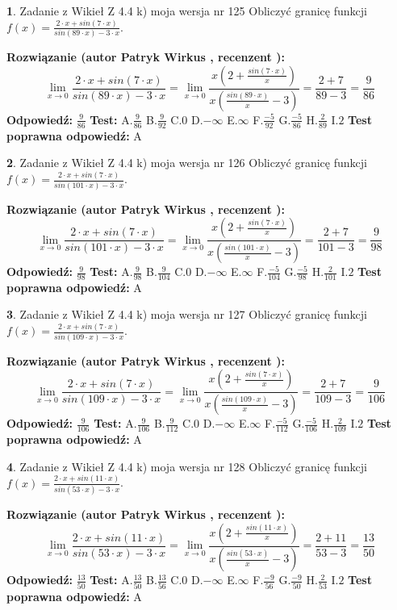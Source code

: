 \documentclass[12pt, a4paper]{article}
\theoremstyle{definition} %
\newtheorem{zad}{}
\newcommand{\zadStart}[1]{\begin{zad}#1\newline}
\newcommand{\zadStop}{\end{zad}}
\newcommand{\rozwStart}[2]{\noindent \textbf{Rozwiązanie (autor #1 , recenzent #2): }\newline}
\newcommand{\rozwStop}{\newline}
\newcommand{\odpStart}{\noindent \textbf{Odpowiedź:}\newline}
\newcommand{\odpStop}{\newline}
\newcommand{\testStart}{\noindent \textbf{Test:}\newline}
\newcommand{\testStop}{\newline}
\newcommand{\kluczStart}{\noindent \textbf{Test poprawna odpowiedź:}\newline}
\newcommand{\kluczStop}{\newline}
\begin{document}
\zadStart{Zadanie z Wikieł Z 4.4 k) moja wersja nr 125}
Obliczyć granicę funkcji $f(x)=\frac{2\cdot x +sin(7\cdot x)}{sin(89\cdot x) -3\cdot x}$.
\zadStop
\rozwStart{Patryk Wirkus}{}
$$\lim\limits_{x\to 0}\frac{2\cdot x +sin(7\cdot x)}{sin(89\cdot x) -3\cdot x}
=\lim\limits_{x\to 0}\frac{x(2+\frac{sin(7\cdot x)}{x})}{x(\frac{sin(89\cdot x)}{x}-3)}
=\frac{2+7}{89-3} = \frac{9}{86}$$
\rozwStop
\odpStart
$\frac{9}{86}$
\odpStop
\testStart
A.$\frac{9}{86}$
B.$\frac{9}{92}$
C.$0$
D.$-\infty$
E.$\infty$
F.$\frac{-5}{92}$
G.$\frac{-5}{86}$
H.$\frac{2}{89}$
I.$2$
\testStop
\kluczStart
A
\kluczStop



\zadStart{Zadanie z Wikieł Z 4.4 k) moja wersja nr 126}
Obliczyć granicę funkcji $f(x)=\frac{2\cdot x +sin(7\cdot x)}{sin(101\cdot x) -3\cdot x}$.
\zadStop
\rozwStart{Patryk Wirkus}{}
$$\lim\limits_{x\to 0}\frac{2\cdot x +sin(7\cdot x)}{sin(101\cdot x) -3\cdot x}
=\lim\limits_{x\to 0}\frac{x(2+\frac{sin(7\cdot x)}{x})}{x(\frac{sin(101\cdot x)}{x}-3)}
=\frac{2+7}{101-3} = \frac{9}{98}$$
\rozwStop
\odpStart
$\frac{9}{98}$
\odpStop
\testStart
A.$\frac{9}{98}$
B.$\frac{9}{104}$
C.$0$
D.$-\infty$
E.$\infty$
F.$\frac{-5}{104}$
G.$\frac{-5}{98}$
H.$\frac{2}{101}$
I.$2$
\testStop
\kluczStart
A
\kluczStop



\zadStart{Zadanie z Wikieł Z 4.4 k) moja wersja nr 127}
Obliczyć granicę funkcji $f(x)=\frac{2\cdot x +sin(7\cdot x)}{sin(109\cdot x) -3\cdot x}$.
\zadStop
\rozwStart{Patryk Wirkus}{}
$$\lim\limits_{x\to 0}\frac{2\cdot x +sin(7\cdot x)}{sin(109\cdot x) -3\cdot x}
=\lim\limits_{x\to 0}\frac{x(2+\frac{sin(7\cdot x)}{x})}{x(\frac{sin(109\cdot x)}{x}-3)}
=\frac{2+7}{109-3} = \frac{9}{106}$$
\rozwStop
\odpStart
$\frac{9}{106}$
\odpStop
\testStart
A.$\frac{9}{106}$
B.$\frac{9}{112}$
C.$0$
D.$-\infty$
E.$\infty$
F.$\frac{-5}{112}$
G.$\frac{-5}{106}$
H.$\frac{2}{109}$
I.$2$
\testStop
\kluczStart
A
\kluczStop



\zadStart{Zadanie z Wikieł Z 4.4 k) moja wersja nr 128}
Obliczyć granicę funkcji $f(x)=\frac{2\cdot x +sin(11\cdot x)}{sin(53\cdot x) -3\cdot x}$.
\zadStop
\rozwStart{Patryk Wirkus}{}
$$\lim\limits_{x\to 0}\frac{2\cdot x +sin(11\cdot x)}{sin(53\cdot x) -3\cdot x}
=\lim\limits_{x\to 0}\frac{x(2+\frac{sin(11\cdot x)}{x})}{x(\frac{sin(53\cdot x)}{x}-3)}
=\frac{2+11}{53-3} = \frac{13}{50}$$
\rozwStop
\odpStart
$\frac{13}{50}$
\odpStop
\testStart
A.$\frac{13}{50}$
B.$\frac{13}{56}$
C.$0$
D.$-\infty$
E.$\infty$
F.$\frac{-9}{56}$
G.$\frac{-9}{50}$
H.$\frac{2}{53}$
I.$2$
\testStop
\kluczStart
A
\kluczStop
\end{document}
